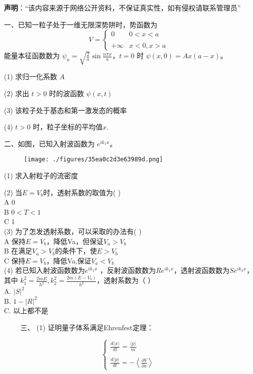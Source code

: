 
\textbf{声明}：“该内容来源于网络公开资料，不保证真实性，如有侵权请联系管理员”

一、已知一粒子处于一维无限深势阱时，势函数为
$$V = \begin{cases} 0 & 0 < x < a \\\\+\infty & x < 0, x > a \end{cases}~$$
能量本征函数数为 $\psi_n = \sqrt{\frac{2}{a}} \sin \frac{n\pi x}{a}$，$t = 0$ 时 $\psi(x, 0) = A x (a - x)$。

(1) 求归一化系数 $A$

(2) 求出 $t > 0$ 时的波函数 $\psi(x, t)$

(3) 该粒子处于基态和第一激发态的概率

(4) $t > 0$ 时，粒子坐标的平均值$x$.

二、如图，已知入射波函数为 $e^{ik_1x}$。
\begin{figure}[ht]
\centering
\texttt{[image: ./figures/35ea0c2d3e63989d.png]}
\caption{} \label{fig_UCSA17_2}
\end{figure}
(1) 求入射粒子的流密度

(2) 当$E = V_b$时，透射系数的取值为( )\\
A 0 \\
B $0 < T < 1$\\
C 1 \\

(3) 为了怎发透射系数，可以采取的办法有( )\\
A 保持$E = V_b$，降低Va，但保证$V_a > V_b$\\
B 在满足$V_a > V_b$的条件下，使$E > V_b$\\
C 保持$E = V_b$，降低Va,保证$V_a < V_b$\\

(4) 若已知入射波函数数为$ e^{ik_1x}$ ，反射波函数数为$R e^{ik_1x}$，透射波函数数为$S e^{ik_2x}$，其中 $k_1^2 = \frac{2mE}{h^2}, k_2^2 = \frac{2m(E - V_b)}{h^2} $，透射系数为（ ）\\
A. $|S|^2$ \\
B. $1 - |R|^2$ \\
C. 以上都不是

　　 三、
(1) 证明量子体系满足Ehrenfest定理：

$$\begin{cases}\frac{d\langle x \rangle}{dt} = \frac{\langle p \rangle}{m} \\\\
\frac{d\langle p \rangle}{dt} = -\left\langle \frac{\partial V}{\partial x} \right\rangle\end{cases}~$$
